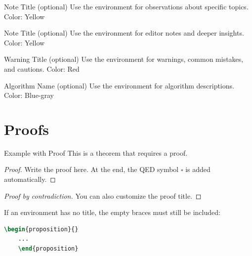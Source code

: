 \documentclass[]{csnotes}
\begin{document}
\begin{observation}{Note Title (optional)}
Use the  environment for observations about specific topics.
Color: Yellow
\end{observation}

\begin{note}{Note Title (optional)}
Use the  environment for editor notes and deeper insights.
Color: Yellow
\end{note}

\begin{warning}{Warning Title (optional)}
Use the  environment for warnings, common mistakes, and cautions.
Color: Red
\end{warning}

\begin{algorithmdesc}{Algorithm Name (optional)}
Use the  environment for algorithm descriptions.
Color: Blue-gray
\end{algorithmdesc}


\section{Proofs}

\begin{theorem}[label=thm:example]{Example with Proof}
This is a theorem that requires a proof.
\end{theorem}

\begin{proof}
Write the proof here. At the end, the QED symbol \(\square\) is added automatically.
\end{proof}

\begin{proof}[Proof by contradiction]
You can also customize the proof title.
\end{proof}

\begin{warning}{}
  If an environment has no title, the empty braces must still be included:
  \begin{lstlisting}[language=TeX]
    \begin{proposition}{}
    ...
    \end{proposition}
  \end{lstlisting}
\end{warning}
\end{document}
